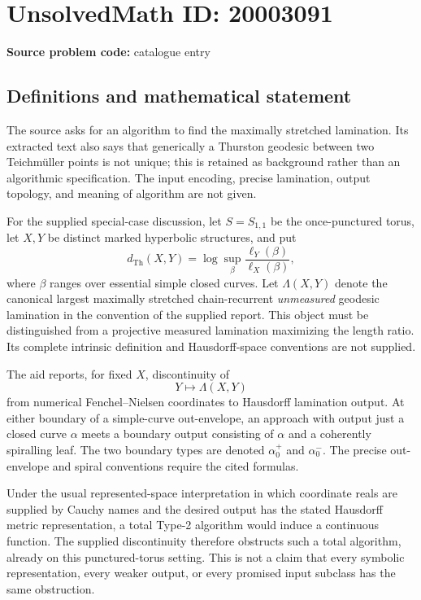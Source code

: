 \documentclass[11pt]{article}
\begin{document}
\section*{UnsolvedMath ID: 20003091}
\textbf{Source problem code:} catalogue entry
\subsection{Definitions and mathematical statement}
The source asks for an algorithm to find the maximally stretched lamination. Its extracted text also says that generically a Thurston geodesic between two Teichm\"uller points is not unique; this is retained as background rather than an algorithmic specification. The input encoding, precise lamination, output topology, and meaning of algorithm are not given.

For the supplied special-case discussion, let \(S=S_{1,1}\) be the once-punctured torus, let \(X,Y\) be distinct marked hyperbolic structures, and put
\[
 d_{\mathrm{Th}}(X,Y)=\log\sup_{\beta}\frac{\ell_Y(\beta)}{\ell_X(\beta)},
\]
where \(\beta\) ranges over essential simple closed curves. Let \(\Lambda(X,Y)\) denote the canonical largest maximally stretched chain-recurrent \emph{unmeasured} geodesic lamination in the convention of the supplied report. This object must be distinguished from a projective measured lamination maximizing the length ratio. Its complete intrinsic definition and Hausdorff-space conventions are not supplied.

The aid reports, for fixed \(X\), discontinuity of
\[
 Y\longmapsto\Lambda(X,Y)
\]
from numerical Fenchel--Nielsen coordinates to Hausdorff lamination output. At either boundary of a simple-curve out-envelope, an approach with output just a closed curve \(\alpha\) meets a boundary output consisting of \(\alpha\) and a coherently spiralling leaf. The two boundary types are denoted \(\alpha_0^+\) and \(\alpha_0^-\). The precise out-envelope and spiral conventions require the cited formulas.

Under the usual represented-space interpretation in which coordinate reals are supplied by Cauchy names and the desired output has the stated Hausdorff metric representation, a total Type-2 algorithm would induce a continuous function. The supplied discontinuity therefore obstructs such a total algorithm, already on this punctured-torus setting. This is not a claim that every symbolic representation, every weaker output, or every promised input subclass has the same obstruction.
\end{document}

